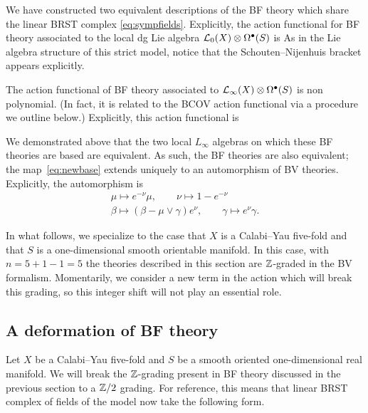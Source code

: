 We have constructed two equivalent descriptions of the BF theory which share the linear BRST complex \eqref{eq:sympfields}.
Explicitly, the action functional for BF theory associated to the local dg Lie algebra $\mathcal L_0(X) \otimes \Omega^{\bullet}(S)$ is
As in the Lie algebra structure of this strict model, notice that the Schouten--Nijenhuis bracket appears explicitly. 

The action functional of BF theory associated to $\mathcal L_\infty(X) \otimes \Omega^{\bullet}(S)$ is non polynomial. 
(In fact, it is related to the BCOV action functional via a procedure we outline below.) 
Explicitly, this action functional is

We demonstrated above that the two local $L_\infty$ algebras on which these BF theories are based are equivalent. As such, the BF theories are also equivalent; the map~\eqref{eq:newbase} extends uniquely to an automorphism of BV theories.
Explicitly, the automorphism is
\begin{multline}\label{eqn:auto1}
  \mu \mapsto e^{-\nu} \mu, \qquad \nu \mapsto 1-e^{-\nu} \\
  \beta \mapsto (\beta - \mu \vee \gamma) e^{\nu},\qquad \gamma \mapsto e^{\nu} \gamma .
\end{multline}

\parsec[]

In what follows, we specialize to the case that $X$ is a Calabi--Yau five-fold and that $S$ is a one-dimensional smooth orientable manifold. 
In this case, with $n = 5 + 1 - 1 = 5$ the theories described in this section are $\mathbb Z$-graded in the BV formalism.
Momentarily, we consider a new term in the action which will break this grading, so this integer shift will not play an essential role.

\subsection{A deformation of BF theory} 

Let $X$ be a Calabi--Yau five-fold and $S$ be a smooth oriented one-dimensional real manifold. 
We will break the $\mathbb Z$-grading present in BF theory discussed in the previous section to a $\mathbb Z/2$ grading. 
For reference, this means that linear BRST complex of fields of the model now take the following form. 

